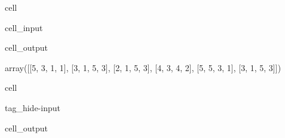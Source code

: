\documentclass[letterpaper,10pt,english]{jupyterBook}
\begin{document}
\begin{sphinxuseclass}{cell}\begin{sphinxVerbatimInput}

\begin{sphinxuseclass}{cell_input}
\begin{sphinxVerbatim}[commandchars=\\\{\}]
  \PYG{p}{[}\PYG{p}{[}\PYG{p}{]}\PYG{p}{[}\PYG{p}{]}\PYG{p}{[}\PYG{p}{]}\PYG{p}{[}\PYG{p}{]}\PYG{p}{[}\PYG{p}{]}\PYG{p}{[}\PYG{p}{]}\PYG{p}{]}
\end{sphinxVerbatim}

\end{sphinxuseclass}\end{sphinxVerbatimInput}
\begin{sphinxVerbatimOutput}

\begin{sphinxuseclass}{cell_output}
\begin{sphinxVerbatim}[commandchars=\\\{\}]
array([[5, 3, 1, 1],
       [3, 1, 5, 3],
       [2, 1, 5, 3],
       [4, 3, 4, 2],
       [5, 5, 3, 1],
       [3, 1, 5, 3]])
\end{sphinxVerbatim}

\end{sphinxuseclass}\end{sphinxVerbatimOutput}

\end{sphinxuseclass}
\begin{sphinxuseclass}{cell}
\begin{sphinxuseclass}{tag_hide-input}\begin{sphinxVerbatimOutput}

\begin{sphinxuseclass}{cell_output}
\noindent{}

\end{sphinxuseclass}\end{sphinxVerbatimOutput}

\end{sphinxuseclass}
\end{sphinxuseclass}
\end{document}
